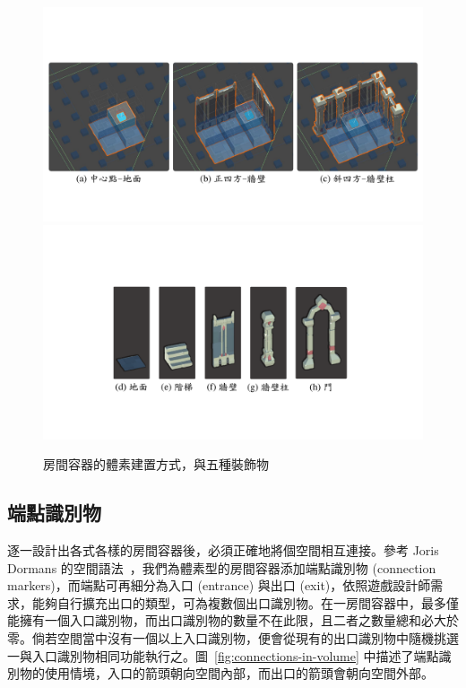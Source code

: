 \begin{figure}[!htb]
  \begin{center}
    \includegraphics[width=1.0\textwidth]{figures/decorations-with-directions.pdf}
    \includegraphics[width=1.0\textwidth]{figures/decorations-with-directions-.pdf}
    \caption{房間容器的體素建置方式，與五種裝飾物}
    \label{fig:decorations-with-directions}
  \end{center}
\end{figure}

\subsection{端點識別物}
\label{ssec:method-spacepieces-connections}

逐一設計出各式各樣的房間容器後，必須正確地將個空間相互連接。參考 Joris Dormans 的空間語法~\cite{dormans2012engineering}，我們為體素型的房間容器添加端點識別物 (connection markers)，而端點可再細分為入口 (entrance) 與出口 (exit)，依照遊戲設計師需求，能夠自行擴充出口的類型，可為複數個出口識別物。在一房間容器中，最多僅能擁有一個入口識別物，而出口識別物的數量不在此限，且二者之數量總和必大於零。倘若空間當中沒有一個以上入口識別物，便會從現有的出口識別物中隨機挑選一與入口識別物相同功能執行之。圖~\ref{fig:connections-in-volume} 中描述了端點識別物的使用情境，入口的箭頭朝向空間內部，而出口的箭頭會朝向空間外部。

